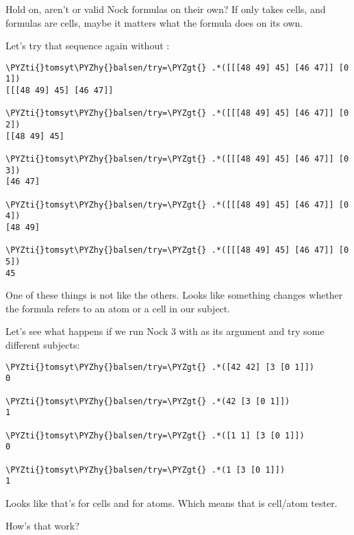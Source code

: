 Hold on, aren't \kode{[0 1]} or \kode{[0 5]} valid Nock formulas on their own?  If 
only takes cells, and formulas are cells, maybe it matters what the formula
does on its own.

Let's try that sequence again without :
\begin{framed_shaded}
\begin{Verbatim}[fontsize=\relsize{-2.5},commandchars=\\\{\}]
\PYZti{}tomsyt\PYZhy{}balsen/try=\PYZgt{} .*([[[48 49] 45] [46 47]] [0 1])
[[[48 49] 45] [46 47]]

\PYZti{}tomsyt\PYZhy{}balsen/try=\PYZgt{} .*([[[48 49] 45] [46 47]] [0 2])
[[48 49] 45]

\PYZti{}tomsyt\PYZhy{}balsen/try=\PYZgt{} .*([[[48 49] 45] [46 47]] [0 3])
[46 47]

\PYZti{}tomsyt\PYZhy{}balsen/try=\PYZgt{} .*([[[48 49] 45] [46 47]] [0 4])
[48 49]

\PYZti{}tomsyt\PYZhy{}balsen/try=\PYZgt{} .*([[[48 49] 45] [46 47]] [0 5])
45
\end{Verbatim}
\end{framed_shaded}
One of these things is not like the others. Looks like something changes
whether the formula \kode{[0 n]} refers to an atom or a cell in our subject.

Let's see what happens if we run Nock 3 with \kode{[0 1]} as its argument and try
some different subjects:
\begin{framed_shaded}
\begin{Verbatim}[fontsize=\relsize{-2.5},commandchars=\\\{\}]
\PYZti{}tomsyt\PYZhy{}balsen/try=\PYZgt{} .*([42 42] [3 [0 1]])
0

\PYZti{}tomsyt\PYZhy{}balsen/try=\PYZgt{} .*(42 [3 [0 1]])
1

\PYZti{}tomsyt\PYZhy{}balsen/try=\PYZgt{} .*([1 1] [3 [0 1]])
0

\PYZti{}tomsyt\PYZhy{}balsen/try=\PYZgt{} .*(1 [3 [0 1]])
1
\end{Verbatim}
\end{framed_shaded}
Looks like that's  for cells and  for atoms. Which means that  is
cell/atom tester.

How's that work?


